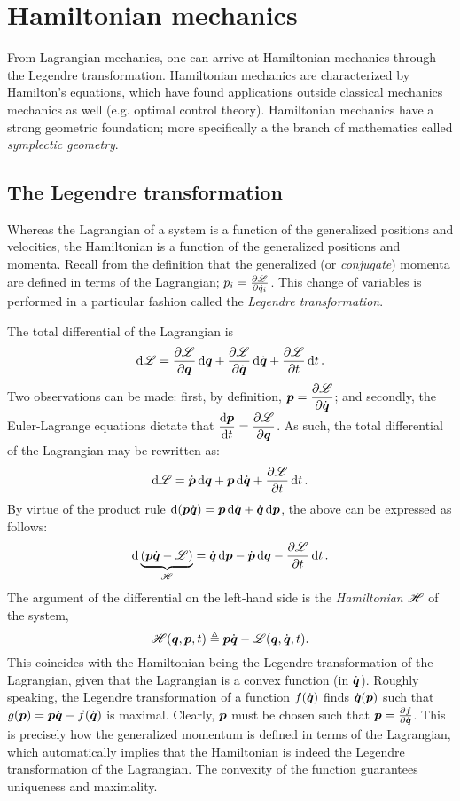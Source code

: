 \section{Hamiltonian mechanics}
\label{sec:hamiltonian}
From Lagrangian mechanics, one can arrive at Hamiltonian mechanics through the Legendre transformation. Hamiltonian mechanics are characterized by Hamilton's equations, which have found applications  outside classical mechanics mechanics as well (e.g. optimal control theory). Hamiltonian mechanics have a strong geometric foundation; more specifically a the branch of mathematics called \emph{symplectic geometry}.

\subsection{The Legendre transformation}
\label{sec:legendre_transform}
Whereas the Lagrangian of a system is a function of the generalized positions and velocities, the Hamiltonian is a function of the generalized positions and momenta. Recall from the definition that the generalized (or \emph{conjugate}) momenta are defined in terms of the Lagrangian; $p_i = \pdv{\ensuremath{\mathscr{L}}}{\dot{q}_i}$. This change of variables is performed in a particular fashion called the \emph{Legendre transformation}.

The total differential of the Lagrangian is
$$ \dd{\ensuremath{\mathscr{L}}} = \pdv{\ensuremath{\mathscr{L}}}{\ensuremath{\vb*{q}}}\dd{\ensuremath{\vb*{q}}} + \pdv{\ensuremath{\mathscr{L}}}{\ensuremath{\dot{\vb*{q}}}}\dd{\ensuremath{\dot{\vb*{q}}}} + \pdv{\ensuremath{\mathscr{L}}}{t}\dd{t}. $$
Two observations can be made: first, by definition, $\displaystyle\vb*{p} = \pdv{\ensuremath{\mathscr{L}}}{\ensuremath{\dot{\vb*{q}}}}$; and secondly, the Euler-Lagrange equations dictate that $\displaystyle \dv{\ensuremath{\vb*{p}}}{t} = \pdv{\ensuremath{\mathscr{L}}}{\ensuremath{\vb*{q}}}$. As such, the total differential of the Lagrangian may be rewritten as: \cite{Landau1960}
$$ \dd{\ensuremath{\mathscr{L}}} = \dot{\vb*{p}}\dd{\ensuremath{\vb*{q}}} + \vb*{p} \dd{\ensuremath{\dot{\vb*{q}}}} + \pdv{\ensuremath{\mathscr{L}}}{t}\dd{t}.$$
By virtue of the product rule $\dd{(\gmom \gvel)} = \gmom\dd{\gvel} + \gvel\dd{\gmom}$, the above can be expressed as follows: 
\begin{equation}
    \dd{\underbrace{(\gmom\gvel - \lag)}_{\ham}} = \gvel\dd{\gmom} - \dot{\gmom}\dd{\gpos} - \pdv{\lag}{t}\dd{t}.
    \label{eq:diff_hamiltonian}
\end{equation}
The argument of the differential on the left-hand side is the \emph{Hamiltonian} $\mathscr{H}$ of the system, 
$$ \mathscr{H}(\vb*{q}, \vb*{p}, t) \triangleq \vb*{p} \dot{\vb*{q}} - \mathscr{L}(\vb*{q}, \dot{\vb*{q}}, t). $$
This coincides with the Hamiltonian being the Legendre transformation of the Lagrangian, given that the Lagrangian is a convex function (in $\dot{\vb*{q}}$). Roughly speaking, the Legendre transformation of a function $f(\dot{\vb*{q}})$ finds $\dot{\vb*{q}}(\vb*{p})$ such that $g(\vb*{p}) = \vb*{p}\dot{\vb*{q}} - f(\dot{\vb*{q}})$ is maximal. Clearly, $\vb*{p}$ must be chosen such that $\vb*{p} = \pdv{f}{\ensuremath{\dot{\vb*{q}}}}$. This is precisely how the generalized momentum is defined in terms of the Lagrangian, which automatically implies that the Hamiltonian is indeed the Legendre transformation of the Lagrangian. The convexity of the function guarantees uniqueness and maximality.

